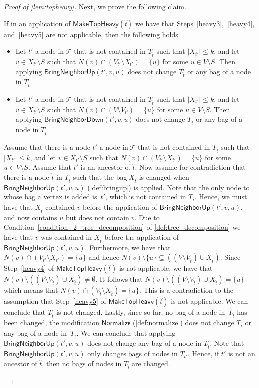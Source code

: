 \documentclass[a4paper,UKenglish,cleveref, autoref, thm-restate, numberwithinsect]{lipics-v2021}
\newcounter{modification}
\newcommand{\Normalize}{\mathsf{Normalize}}
\newcommand{\BringNeighborUp}{\mathsf{BringNeighborUp}}
\newcommand{\BringNeighborDown}{\mathsf{BringNeighborDown}}
\newcommand{\MakeTopHeavy}{\mathsf{MakeTopHeavy}}
\begin{document}
\begin{proof}[Proof of \cref{lem:topheavy}]
Next, we prove the following claim.
\begin{claim}
If in an application of $\MakeTopHeavy({\hat{t}})$ 
we have that Steps~\ref{heavy3},~\ref{heavy4}, and~\ref{heavy5} are not applicable, then the following holds.
\begin{itemize}
\item Let $t'$ a node in $\mathcal{T}$ that is not contained in $T_{\hat{t}}$ such that $|X_{t'}|\le k$, and let $v\in X_{t'}\setminus S$ such that $N(v)\cap (V_{t'}\setminus X_{t'})=\{u\}$ for some $u\in V\setminus S$. Then applying $\BringNeighborUp(t', v, u)$ does not change $T_{\hat{t}}$ or any bag of a node in $T_{\hat{t}}$.
\item Let $t'$ a node in $\mathcal{T}$ that is not contained in $T_{\hat{t}}$ such that $|X_{t'}|\le k$, and let $v\in X_{t'}\setminus S$ such that $N(v)\cap (V\setminus V_{t'})=\{u\}$ for some $u\in V\setminus S$. Then applying $\BringNeighborDown(t', v, u)$ does not change $T_{\hat{t}}$ or any bag of a node in $T_{\hat{t}}$.
\end{itemize}
\end{claim}
\begin{claimproof}
Assume that there is a node $t'$ a node in $\mathcal{T}$ that is not contained in $T_{\hat{t}}$ such that $|X_{t'}|\le k$, and let $v\in X_{t'}\setminus S$ such that $N(v)\cap (V_{t'}\setminus X_{t'})=\{u\}$ for some $u\in V\setminus S$.
Assume that $t'$ is an ancestor of ${\hat{t}}$.
Now assume for contradiction that there is a node $\check{t}$ in $T_{\hat{t}}$ such that the bag $X_{\check{t}}$ is changed when $\BringNeighborUp(t', v, u)$ (\cref{def:bringup}) is applied.
Note that the only node to whose bag a vertex is added is~$t'$, which is not contained in $T_{\hat{t}}$. Hence, we must have that $X_{\check{t}}$ contained $v$ before the application of $\BringNeighborUp(t', v, u)$, and now contains $u$ but does not contain $v$. Due to Condition~\ref{condition_2_tree_decomposition} of \cref{def:tree_decomposition} we have that $v$ was  contained in $X_{\hat{t}}$ before the application of $\BringNeighborUp(t', v, u)$. 
Furthermore, we have that $N(v)\cap (V_{t'}\setminus X_{t'})=\{u\}$ and hence $N(v)\setminus \{u\}\subseteq ((V\setminus V_{\hat{t}})\cup X_{\hat{t}})$. Since Step~\ref{heavy4} of $\MakeTopHeavy({\hat{t}})$ is not applicable, we have that $N(v)\setminus ((V\setminus V_{\hat{t}})\cup X_{\hat{t}})\neq \emptyset$. It follows that $N(v)\setminus ((V\setminus V_{\hat{t}})\cup X_{\hat{t}})= \{u\}$ which means that $N(v)\cap (V_{\hat{t}}\setminus X_{\hat{t}})=\{u\}$. This is a contradiction to the assumption that Step~\ref{heavy5} of $\MakeTopHeavy({\hat{t}})$ is not applicable. 
We can conclude that $T_{\hat{t}}$ is not changed. Lastly, since so far, no bag of a node in~$T_{\hat{t}}$ has been changed, the modification $\Normalize$ (\cref{def:normalize}) does not change $T_{\hat{t}}$ or any bag of a node in~$T_{\hat{t}}$. We can conclude that applying $\BringNeighborUp(t', v, u)$ does not change any bag of a node in $T_{\hat{t}}$. 
Note that $\BringNeighborUp(t', v, u)$ only changes bags of nodes in $T_{t'}$. Hence, if $t'$ is not an ancestor of ${\hat{t}}$, then no bags of nodes in $T_{\hat{t}}$ are changed.


\end{claimproof}
\end{proof}
\end{document}
